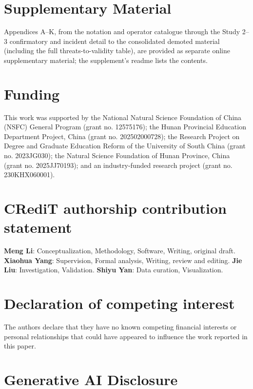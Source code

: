 \documentclass[manuscript,screen,review]{acmart}
\begin{document}


\section*{Supplementary Material}

Appendices A--K, from the notation and operator catalogue through the Study
2--3 confirmatory and incident detail to the consolidated demoted material
(including the full threats-to-validity table), are provided as separate
online supplementary material; the supplement's readme lists the contents.

\section*{Funding}

This work was supported by the National Natural Science Foundation of China
(NSFC) General Program (grant no. 12575176); the Hunan Provincial Education
Department Project, China (grant no. 202502000728); the Research Project on
Degree and Graduate Education Reform of the University of South China (grant
no. 2023JG030); the Natural Science Foundation of Hunan Province, China (grant
no. 2025JJ70193); and an industry-funded research project (grant no.
230KHX060001).

\section*{CRediT authorship contribution statement}

\textbf{Meng Li}: Conceptualization, Methodology, Software, Writing, original
draft. \textbf{Xiaohua Yang}: Supervision, Formal analysis, Writing, review
and editing. \textbf{Jie Liu}: Investigation, Validation. \textbf{Shiyu Yan}:
Data curation, Visualization.

\section*{Declaration of competing interest}

The authors declare that they have no known competing financial interests or
personal relationships that could have appeared to influence the work reported
in this paper.

\section*{Generative AI Disclosure}
\end{document}
